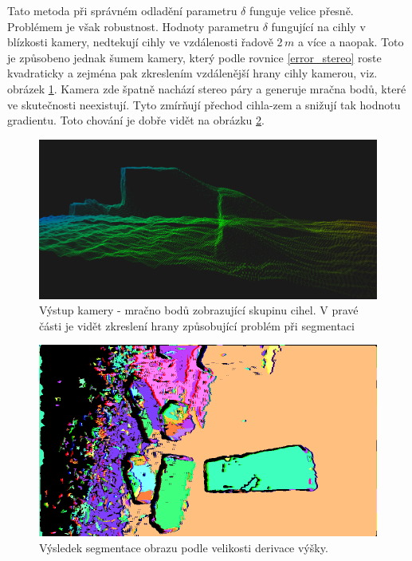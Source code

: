 \documentclass[twoside]{ctuthesis}
\begin{document}
Tato metoda při správném odladění parametru $\delta$ funguje velice přesně. Problémem je však robustnost. Hodnoty parametru $\delta$ fungující na cihly v blízkosti kamery, nedtekují cihly ve vzdálenosti řadově 2\,$m$ a více a naopak. Toto je způsobeno jednak šumem kamery, který podle rovnice \ref{error_stereo} roste kvadraticky a zejména pak zkreslením vzdálenější hrany cihly kamerou, viz. obrázek \ref{fig:point_cloud_grad}. Kamera zde špatně nachází stereo páry a generuje mračna bodů, které ve skutečnosti neexistují. Tyto zmírňují přechod cihla-zem a snižují tak hodnotu gradientu. Toto chování je dobře vidět na obrázku \ref{fig:sobel_segment}.
\begin{figure}
    \centering
    \includegraphics[width = \linewidth]{pictures/pc_crop.png}
    \caption{Výstup kamery - mračno bodů zobrazující skupinu cihel. V pravé části je vidět zkreslení hrany způsobující problém při segmentaci}
    \label{fig:point_cloud_grad}
\end{figure}

\begin{figure}
    \centering
    \includegraphics[width = \linewidth]{pictures/obr10_grad.png}
    \caption{Výsledek segmentace obrazu podle velikosti derivace výšky.}
    \label{fig:sobel_segment}
\end{figure}
\end{document}
